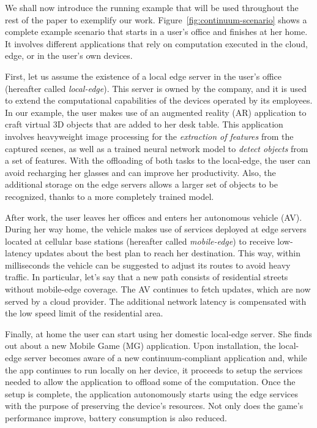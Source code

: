 We shall now introduce the running example that will be used throughout the rest of the paper to exemplify our work. Figure~\ref{fig:continuum-scenario} shows a complete example scenario that starts in a user's office and finishes at her home. It involves different applications that rely on computation executed in the cloud, edge, or in the user's own devices. 

First, let us assume the existence of a local edge server in the user's office (hereafter called \textit{local-edge}). This server is owned by the company, and it is used to extend the computational capabilities of the devices operated by its employees. In our example, the user makes use of an augmented reality (AR) application to craft virtual 3D objects that are added to her desk table. This application involves heavyweight image processing for the \textit{extraction of features} from the captured scenes, as well as a trained neural network model to \textit{detect objects} from a set of features. With the offloading of both tasks to the local-edge, the user can avoid recharging her glasses and can improve her productivity. Also, the additional storage on the edge servers allows a larger set of objects to be recognized, thanks to a more completely trained model.

After work, the user leaves her offices and enters her autonomous vehicle (AV). During her way home, the vehicle makes use of services deployed at edge servers located at cellular base stations (hereafter called \textit{mobile-edge}) to receive low-latency updates about the best plan to reach her destination. This way, within milliseconds the vehicle can be suggested to adjust its routes to avoid heavy traffic. In particular, let's say that a new path consists of residential streets without mobile-edge coverage. The AV continues to fetch updates, which are now served by a cloud provider. The additional network latency is compensated with the low speed limit of the residential area.

Finally, at home the user can start using her domestic local-edge server. She finds out about a new Mobile Game (MG) application. Upon installation, the local-edge server becomes aware of a new continuum-compliant application and, while the app continues to run locally on her device, it proceeds to setup the services needed to allow the application to offload some of the computation. Once the setup is complete, the application autonomously starts using the edge services with the purpose of preserving the device's resources. Not only does the game's performance improve, battery consumption is also reduced.  

